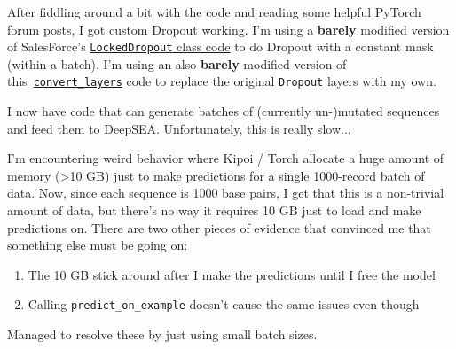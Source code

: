 \begin{Minutes}{}
\maketitle
{}
After fiddling around a bit with the code and reading some helpful PyTorch forum posts, I got custom Dropout working. I'm using a \textbf{barely} modified version of SalesForce's \href{https://pytorchnlp.readthedocs.io/en/latest/_modules/torchnlp/nn/lock_dropout.html}{\texttt{LockedDropout} class code} to do Dropout with a constant mask (within a batch). I'm using an also \textbf{barely} modified version of this~\href{https://discuss.pytorch.org/t/how-can-i-replace-an-intermediate-layer-in-a-pre-trained-network/3586/7}{\texttt{convert\_layers}} code to replace the original \verb=Dropout= layers with my own.

I now have code that can generate batches of (currently un-)mutated sequences and feed them to DeepSEA. Unfortunately, this is really slow...

I'm encountering weird behavior where Kipoi / Torch allocate a huge amount of memory (>10 GB) just to make predictions for a single 1000-record batch of data. Now, since each sequence is 1000 base pairs, I get that this is a non-trivial amount of data, but there's no way it requires 10 GB just to load and make predictions on. There are two other pieces of evidence that convinced me that something else must be going on:
\begin{enumerate}
    \item The 10 GB stick around after I make the predictions until I free the model
    \item Calling \verb|predict_on_example| doesn't cause the same issues even though
\end{enumerate}
Managed to resolve these by just using small batch sizes.

\end{Minutes}
